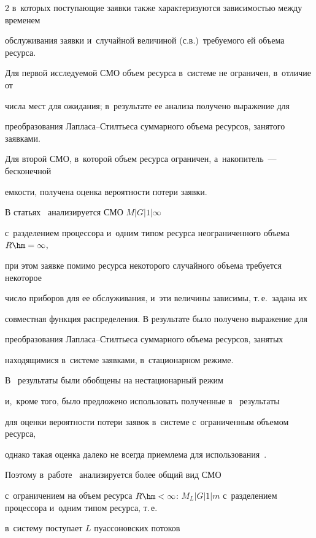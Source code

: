 \begin{multicols}{2}
в~которых поступающие заявки также характеризуются зависимостью между временем 


обслуживания заявки и~случайной величиной (с.в.)\ требуемого ей объема ресурса. 


Для первой исследуемой СМО объем ресурса в~сис\-те\-ме не ограничен, в~отличие от 


числа мест для ожидания; в~результате ее анализа получено выражение для 


преобразования Лап\-ла\-са--Стилть\-еса суммарного объема ресурсов, занятого заявками. 


Для второй СМО, в~которой объем ресурса ограничен, а~накопитель~--- бесконечной 


емкости, получена оценка вероятности потери заявки.





В статьях~\cite{Sengupta,Tihonenko_40_2002} анализируется СМО $M|G|1|\infty$ 


с~разделением процессора и~одним типом ресурса неограниченного объема $R\hm=\infty$, 


при этом заявке помимо ресурса некоторого случайного объема требуется некоторое 


число приборов для ее обслуживания, и~эти величины зависимы, т.\,е.\ задана их 


совместная функция распределения. В результате было получено выражение для 


преобразования Лап\-ла\-са--Стилть\-еса суммарного объема ресурсов, занятых 


находящимися в~сис\-те\-ме заявками, в~стационарном режиме.


В~\cite{Tihonenko_40_2002} результаты были обобщены на нестационарный режим 


и,~кроме того, было предложено использовать полученные в~\cite{Sengupta} результаты 


для оценки вероятности потери заявок в~сис\-те\-ме с~ограниченным объемом ресурса, 


однако такая оценка далеко не всегда приемлема для использования~\cite{Tihonenko_40_2002}.


Поэтому в~работе~\cite{Tihonenko_25_2010} анализируется более общий вид СМО 


с~ограничением на объем ресурса $R\hm<\infty$: $M_{L}|G|1|m$ с~разделением процессора и~одним типом ресурса, т.\,е.\ 


в~сис\-те\-му поступает $L$ пуассоновских потоков 



\end{multicols}
